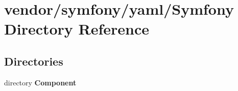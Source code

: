\section{vendor/symfony/yaml/\+Symfony Directory Reference}
\label{dir_9afc1b0fec1b505d4bd03a92b39efbf4}
\subsection*{Directories}
\begin{DoxyCompactItemize}
\item 
directory {\bf Component}
\end{DoxyCompactItemize}
